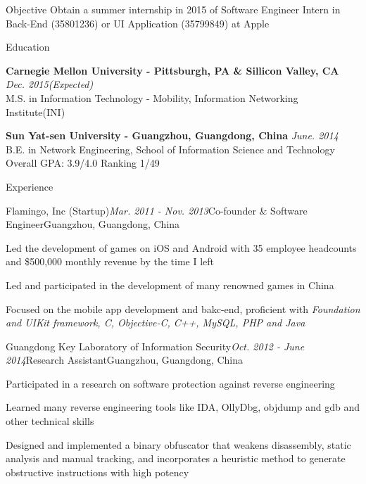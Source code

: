 \documentclass{resume} %
\begin{document}
\begin{rSection}{Objective}
Obtain a summer internship in 2015 of Software Engineer Intern in Back-End (35801236) or UI Application (35799849) at Apple

\end{rSection}


\begin{rSection}{Education}

{\bf Carnegie Mellon University - Pittsburgh, PA \& Sillicon Valley, CA} \hfill {\em Dec. 2015(Expected)} \\ 
M.S. in Information Technology - Mobility, Information Networking Institute(INI) 


{\bf Sun Yat-sen University - Guangzhou, Guangdong, China} \hfill {\em June. 2014} \\ 
B.E. in Network Engineering, 
School of Information Science and Technology \\
Overall GPA: 3.9/4.0 Ranking 1/49

\end{rSection}


\begin{rSection}{Experience}

\begin{rSubsection}{Flamingo, Inc (Startup)}{\em Mar. 2011 - Nov. 2013}{Co-founder \& Software Engineer}{Guangzhou, Guangdong, China}
\item Led the development of games on iOS and Android with 35 employee headcounts and \$500,000 monthly revenue by the time I left
\item Led and participated in the development of many renowned games in China
\item Focused on the mobile app development and bakc-end, proficient with \textit{Foundation and UIKit framework, C, Objective-C, C++, MySQL, PHP and Java}
\end{rSubsection}

\begin{rSubsection}{Guangdong Key Laboratory of Information Security}{\em Oct. 2012 - June 2014}{Research Assistant}{Guangzhou, Guangdong, China}
\item Participated in a research on software protection against reverse engineering
\item Learned many reverse engineering tools like IDA, OllyDbg, objdump and gdb and other technical skills
\item Designed and implemented a binary obfuscator that weakens disassembly, static analysis and manual tracking, and incorporates a heuristic method to generate obstructive instructions with high potency
\end{rSubsection}


\end{rSection}
\end{document}
